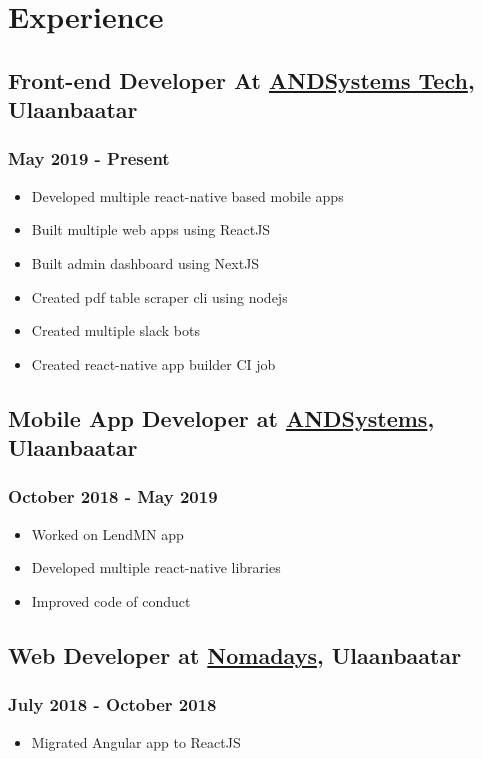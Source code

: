 \documentclass[letterpaper]{article}
\date{\today}
\title{}
\begin{document}

\section{Experience}
\label{sec:orgac9b9a3}
\subsection{Front-end Developer At \href{https://andsystems.net}{ANDSystems Tech}, Ulaanbaatar}
\label{sec:org38f04f7}
\subsubsection{May 2019 - Present}
\label{sec:org8a1ea2c}
\begin{itemize}
\item Developed multiple react-native based mobile apps
\item Built multiple web apps using ReactJS
\item Built admin dashboard using NextJS
\item Created pdf table scraper cli using nodejs
\item Created multiple slack bots
\item Created react-native app builder CI job
\end{itemize}
\subsection{Mobile App Developer at \href{https://andsystems.net}{ANDSystems}, Ulaanbaatar}
\label{sec:orgc9cc8d0}
\subsubsection{October 2018 - May 2019}
\label{sec:orgb6a2469}
\begin{itemize}
\item Worked on LendMN app
\item Developed multiple react-native libraries
\item Improved code of conduct
\end{itemize}
\subsection{Web Developer at \href{https:nomadays.com}{Nomadays}, Ulaanbaatar}
\label{sec:org3899f40}
\subsubsection{July 2018 - October 2018}
\label{sec:org999cffa}
\begin{itemize}
\item Migrated Angular app to ReactJS
\end{itemize}
\end{document}
